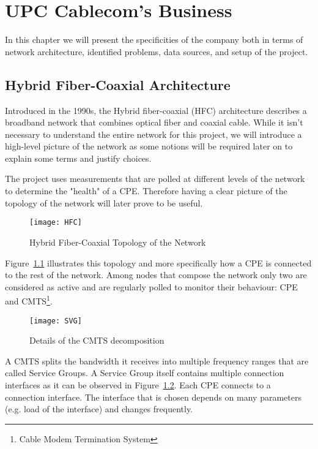 \chapter{UPC Cablecom's Business}
In this chapter we will present the specificities of the company both in terms of network architecture, identified problems, data sources, and setup of the project.

\section{Hybrid Fiber-Coaxial Architecture}
\label{sec:HFC_archi}
Introduced in the 1990s, the Hybrid fiber-coaxial (HFC)\cite{wiki:hfc} architecture describes a broadband network that combines optical fiber and coaxial cable. While it isn't necessary to understand the entire network for this project, we will introduce  a high-level picture of the network as some notions will be required later on to explain some terms and justify choices. 

\vspace{2 \baselineskip}
The project uses measurements that are polled at different levels of the network to determine the "health" of a CPE. Therefore having a clear picture of the topology of the network will later prove to be useful. 

\begin{figure}[ht]
    \begin{center}
    \texttt{[image: HFC]}
    \end{center}
    \caption{Hybrid Fiber-Coaxial Topology of the Network}
    \label{HFC}
\end{figure}

Figure~\ref{HFC} illustrates this topology and more specifically how a CPE is connected to the rest of the network. Among nodes that compose the network only two are considered as active and are regularly polled to monitor their behaviour: CPE and CMTS\footnote{Cable Modem Termination System}.

\begin{figure}[ht]
    \begin{center}
    \texttt{[image: SVG]}
    \end{center}
    \caption{Details of the CMTS decomposition}
    \label{SVG}
\end{figure}

A CMTS splits the bandwidth it receives into multiple frequency ranges that are called Service Groups. A Service Group itself contains multiple connection interfaces as it can be observed in Figure~\ref{SVG}. Each CPE connects to a connection interface. The interface that is chosen depends on many parameters (e.g. load of the interface) and changes frequently. 


